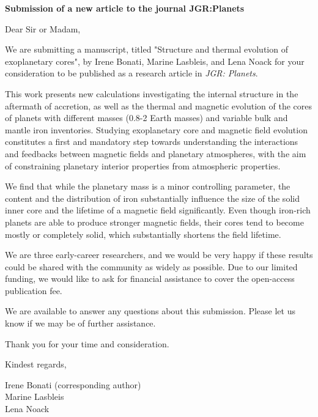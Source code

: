 \documentclass[12pt,stdletter,dateno,sigleft]{newlfm}
\begin{document}
\begin{newlfm}


\textbf{Submission of a new article to the journal JGR:Planets}

\vspace{0.2cm}

Dear Sir or Madam,

We are submitting a manuscript, titled "Structure and thermal evolution of exoplanetary cores", by Irene Bonati, Marine Lasbleis, and Lena Noack for your consideration to be published as a research article in \textit{JGR: Planets}. 

This work presents new calculations investigating the internal structure in the aftermath of accretion, as well as the thermal and magnetic evolution of the cores of planets with different masses (0.8-2 Earth masses) and variable bulk and mantle iron inventories. Studying exoplanetary core and magnetic field evolution constitutes a first and mandatory step towards understanding the interactions and feedbacks between magnetic fields and planetary atmospheres, with the aim of constraining planetary interior properties from atmospheric properties. 

We find that while the planetary mass is a minor controlling parameter, the content and the distribution of iron substantially influence the size of the solid inner core and the lifetime of a magnetic field significantly. Even though iron-rich planets are able to produce stronger magnetic fields, their cores tend to become mostly or completely solid, which substantially shortens the field lifetime.

We are three early-career researchers, and we would be very happy if these results could be shared with the community as widely as possible. Due to our limited funding, we would like to ask for financial assistance to cover the open-access publication fee.

We are available to answer any questions about this submission. Please let us know if we may be of further assistance.

Thank you for your time and consideration. 

Kindest regards,

Irene Bonati (corresponding author)\\
Marine Lasbleis \\
Lena Noack

\end{newlfm}
\end{document}
